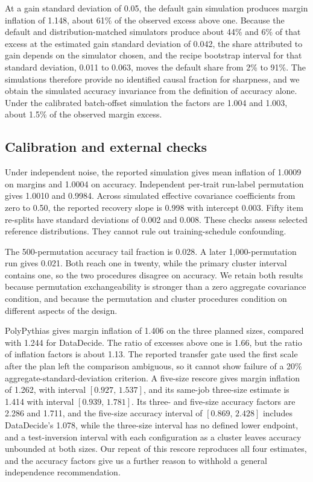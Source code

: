 \documentclass{article}
\newcommand{\ci}[2]{\ensuremath{[#1,\,#2]}}
\begin{document}
At a gain standard deviation of 0.05, the default gain simulation produces margin inflation of 1.148, about 61\% of the observed excess above one. Because the default and distribution-matched simulators produce about 44\% and 6\% of that excess at the estimated gain standard deviation of 0.042, the share attributed to gain depends on the simulator chosen, and the recipe bootstrap interval for that standard deviation, 0.011 to 0.063, moves the default share from 2\% to 91\%. The simulations therefore provide no identified causal fraction for sharpness, and we obtain the simulated accuracy invariance from the definition of accuracy alone. Under the calibrated batch-offset simulation the factors are 1.004 and 1.003, about 1.5\% of the observed margin excess.

\subsection{Calibration and external checks}
Under independent noise, the reported simulation gives mean inflation of 1.0009 on margins and 1.0004 on accuracy. Independent per-trait run-label permutation gives 1.0010 and 0.9984. Across simulated effective covariance coefficients from zero to 0.50, the reported recovery slope is 0.998 with intercept 0.003. Fifty item re-splits have standard deviations of 0.002 and 0.008. These checks assess selected reference distributions. They cannot rule out training-schedule confounding.

The 500-permutation accuracy tail fraction is 0.028. A later 1,000-permutation run gives 0.021. Both reach one in twenty, while the primary cluster interval contains one, so the two procedures disagree on accuracy. We retain both results because permutation exchangeability is stronger than a zero aggregate covariance condition, and because the permutation and cluster procedures condition on different aspects of the design.

PolyPythias gives margin inflation of 1.406 on the three planned sizes, compared with 1.244 for DataDecide. The ratio of excesses above one is 1.66, but the ratio of inflation factors is about 1.13. The reported transfer gate used the first scale after the plan left the comparison ambiguous, so it cannot show failure of a 20\% aggregate-standard-deviation criterion. A five-size rescore gives margin inflation of 1.262, with interval \ci{0.927}{1.537}, and its same-job three-size estimate is 1.414 with interval \ci{0.939}{1.781}. Its three- and five-size accuracy factors are 2.286 and 1.711, and the five-size accuracy interval of \ci{0.869}{2.428} includes DataDecide's 1.078, while the three-size interval has no defined lower endpoint, and a test-inversion interval with each configuration as a cluster leaves accuracy unbounded at both sizes. Our repeat of this rescore reproduces all four estimates, and the accuracy factors give us a further reason to withhold a general independence recommendation.
\end{document}

